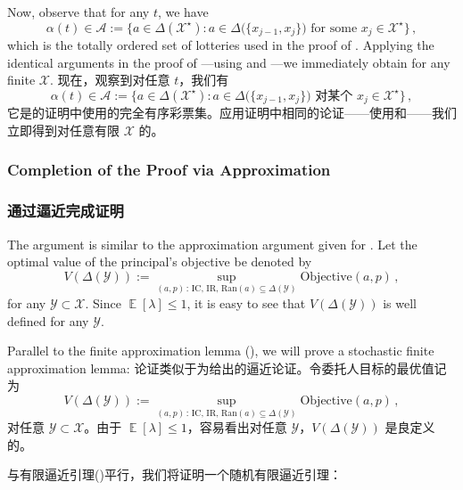 \documentclass[12pt,letterpaper]{article}
\newenvironment{original}{\color{black}\noindent}{}
\newenvironment{translation}{\color{blue}\noindent}{}
\theoremstyle{plain}
\theoremstyle{definition}
\theoremstyle{remark}
\DeclareMathOperator{\E}{\mathds{E}}
\newcommand{\Y}{\mathcal{Y}}
\renewcommand{\1}{\mathds{1}}
\newcommand{\X}{\mathcal{X}}
\theoremstyle{definition}
\begin{document}
\begin{original}
Now, observe that for any $t$, we have
\[\alpha(t) \in \mathcal{A}:= \Big\{a\in \Delta(\X^\star): a \in \Delta\big(\{x_{j-1}, x_j\}\big) \text{ for some $x_j \in \X^\star$}\Big\}\,,\]
which is the totally ordered set of lotteries used in the proof of . Applying the identical arguments in the proof of  ---using  and ---we immediately obtain  for any finite $\X$.
\end{original}
\begin{translation}
现在，观察到对任意 $t$，我们有
\[\alpha(t) \in \mathcal{A}:= \Big\{a\in \Delta(\X^\star): a \in \Delta\big(\{x_{j-1}, x_j\}\big) \text{ 对某个 $x_j \in \X^\star$}\Big\}\,,\]
它是的证明中使用的完全有序彩票集。应用证明中相同的论证——使用和——我们立即得到对任意有限 $\X$ 的。
\end{translation}

\begin{original}
\subsubsection{Completion of the Proof via Approximation}
\end{original}
\begin{translation}
\subsubsection{通过逼近完成证明}
\end{translation}

\begin{original}
The argument is similar to the approximation argument given for . Let the optimal value of the principal's objective be denoted by
\[V(\Delta(\Y)):= \sup_{(a, p)\,:\,\text{IC, IR, Ran}(a) \subseteq \Delta(\Y)} \text{Objective}(a, p)\,,\]
for any $\Y \subset \X$. Since $\E[\lambda] \leq 1$, it is easy to see that $V(\Delta(\Y))$ is well defined for any $\Y$.

Parallel to the finite approximation lemma (), we will prove a stochastic finite approximation lemma:
\end{original}
\begin{translation}
论证类似于为给出的逼近论证。令委托人目标的最优值记为
\[V(\Delta(\Y)):= \sup_{(a, p)\,:\,\text{IC, IR, Ran}(a) \subseteq \Delta(\Y)} \text{Objective}(a, p)\,,\]
对任意 $\Y \subset \X$。由于 $\E[\lambda] \leq 1$，容易看出对任意 $\Y$，$V(\Delta(\Y))$ 是良定义的。

与有限逼近引理()平行，我们将证明一个随机有限逼近引理：
\end{translation}
\end{document}
